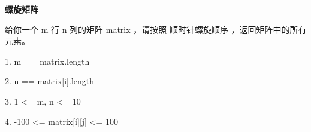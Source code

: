 \textbf{螺旋矩阵}\par

给你一个 m 行 n 列的矩阵 matrix ，请按照 顺时针螺旋顺序 ，返回矩阵中的所有元素。\par

1. m == matrix.length\par
2. n == matrix[i].length\par
3. 1 <= m, n <= 10\par
4. -100 <= matrix[i][j] <= 100\par
